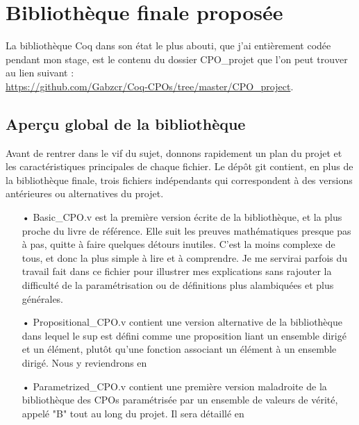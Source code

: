 \documentclass{article}
\newcommand\code[1]{{\fontfamily{lmtt}\selectfont #1}}
\theoremstyle{definition}
\begin{document}
\newpage

\section{Bibliothèque finale proposée}

La bibliothèque Coq dans son état le plus abouti, que j'ai entièrement codée pendant mon stage, est le contenu du dossier \code{CPO\_projet} que l'on peut trouver au lien suivant :\\ \href{https://github.com/Gabzcr/Coq-CPOs/tree/master/CPO\_project}{https://github.com/Gabzcr/Coq-CPOs/tree/master/CPO\_project}.

\subsection{Aperçu global de la bibliothèque}

Avant de rentrer dans le vif du sujet, donnons rapidement un plan du projet et les caractéristiques principales de chaque fichier. Le dépôt git contient, en plus de la bibliothèque finale, trois fichiers indépendants qui correspondent à des versions antérieures ou alternatives du projet.

\medskip

\begin{itemize}
\item[•] \code{Basic\_CPO.v} est la première version écrite de la bibliothèque, et la plus proche du livre de référence. Elle suit les preuves mathématiques presque pas à pas, quitte à faire quelques détours inutiles. C'est la moins complexe de tous, et donc la plus simple à lire et à comprendre. Je me servirai parfois du travail fait dans ce fichier pour illustrer mes explications sans rajouter la difficulté de la paramétrisation ou de définitions plus alambiquées et plus générales.
\item[•] \code{Propositional\_CPO.v} contient une version alternative de la bibliothèque dans lequel le sup est défini comme une proposition liant un ensemble dirigé et un élément, plutôt qu'une fonction associant un élément à un ensemble dirigé. Nous y reviendrons en %
\item[•] \code{Parametrized\_CPO.v} contient une première version maladroite de la bibliothèque des CPOs paramétrisée par un ensemble de valeurs de vérité, appelé "B" tout au long du projet. Il sera détaillé en %
\end{itemize}
\end{document}
